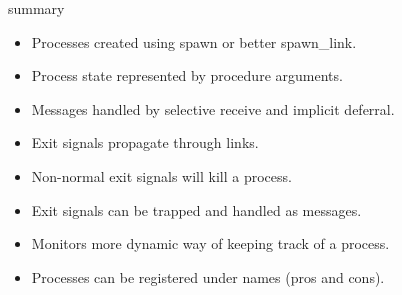 \begin{frame}{summary}

\begin{itemize}
\item Processes created using spawn or better spawn\_link.
\item Process state represented by procedure arguments.
\item Messages handled by selective receive and implicit deferral.
\item Exit signals propagate through links.
\item Non-normal exit signals will kill a process.
\item Exit signals can be trapped and handled as messages.
\item Monitors more dynamic way of keeping track of a process.
\item Processes can be registered under names (pros and cons).
\end{itemize}
\end{frame}






